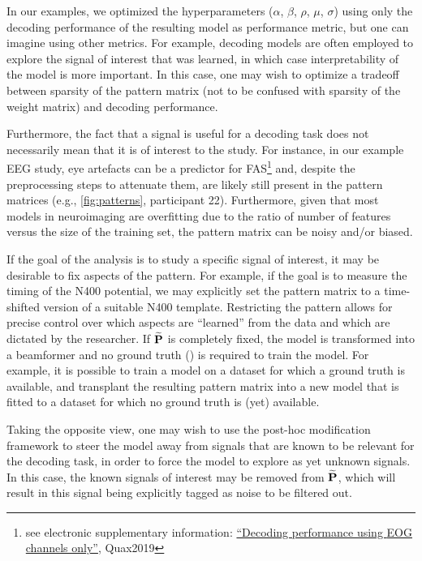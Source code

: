 \documentclass[a4paper]{vanvliet_paper}
\newcommand{\modpat}{\widetilde{\mat{P}}}
\newcommand{\tmodpat}{$\modpat$\xspace}
\begin{document}
In our examples, we optimized the hyperparameters ($\alpha$, $\beta$, $\rho$, $\mu$, $\sigma$) using only the decoding performance of the resulting model as performance metric, but one can imagine using other metrics.
For example, decoding models are often employed to explore the signal of interest that was learned, in which case interpretability of the model is more important\cite{Haufe2014, Parra2003}.
In this case, one may wish to optimize a tradeoff between sparsity of the pattern matrix (not to be confused with sparsity of the weight matrix) and decoding performance\cite{Kia2017}.

Furthermore, the fact that a signal is useful for a decoding task does not necessarily mean that it is of interest to the study.
For instance, in our example \gls{EEG} study, eye artefacts can be a predictor for \gls{FAS}\footnote{\raggedright see electronic supplementary information: \href{https://aaltoimaginglanguage.github.io/posthoc}{``Decoding performance using \gls{EOG} channels only''}, Quax2019} and, despite the preprocessing steps to attenuate them, are likely still present in the pattern matrices (e.g., \autoref{fig:patterns}, participant 22).
Furthermore, given that most models in neuroimaging are overfitting due to the ratio of number of features versus the size of the training set, the pattern matrix can be noisy and/or biased.

If the goal of the analysis is to study a specific signal of interest, it may be desirable to fix aspects of the pattern.
For example, if the goal is to measure the timing of the N400 potential, we may explicitly set the pattern matrix to a time-shifted version of a suitable N400 template.
Restricting the pattern allows for precise control over which aspects are ``learned'' from the data and which are dictated by the researcher.
If \tmodpat is completely fixed, the model is transformed into a beamformer\cite{VanVliet2016a, Treder2016} and no ground truth () is required to train the model.
For example, it is possible to train a model on a dataset for which a ground truth is available, and transplant the resulting pattern matrix into a new model that is fitted to a dataset for which no ground truth is (yet) available\cite{VanVliet2018}.

Taking the opposite view, one may wish to use the post-hoc modification framework to steer the model away from signals that are known to be relevant for the decoding task, in order to force the model to explore as yet unknown signals.
In this case, the known signals of interest may be removed from \tmodpat, which will result in this signal being explicitly tagged as noise to be filtered out.
\end{document}
